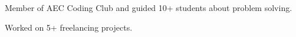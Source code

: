 \item Member of AEC Coding Club and guided 10+ students about problem solving.
\item Worked on 5+ freelancing projects.